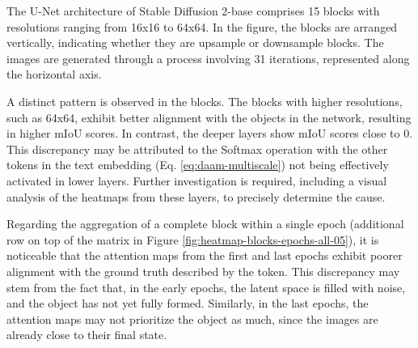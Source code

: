 The U-Net architecture of Stable Diffusion 2-base comprises 15 blocks with resolutions ranging from 16x16 to 64x64. In the figure, the blocks are arranged vertically, indicating whether they are upsample or downsample blocks. The images are generated through a process involving 31 iterations, represented along the horizontal axis.

A distinct pattern is observed in the blocks. The blocks with higher resolutions, such as 64x64, exhibit better alignment with the objects in the network, resulting in higher mIoU scores. In contrast, the deeper layers show mIoU scores close to 0. This discrepancy may be attributed to the Softmax operation with the other tokens in the text embedding (Eq. \ref{eq:daam-multiscale}) not being effectively activated in lower layers. Further investigation is required, including a visual analysis of the heatmaps from these layers, to precisely determine the cause.

Regarding the aggregation of a complete block within a single epoch (additional row on top of the matrix in Figure \ref{fig:heatmap-blocks-epochs-all-05}), it is noticeable that the attention maps from the first and last epochs exhibit poorer alignment with the ground truth described by the token. This discrepancy may stem from the fact that, in the early epochs, the latent space is filled with noise, and the object has not yet fully formed. Similarly, in the last epochs, the attention maps may not prioritize the object as much, since the images are already close to their final state.


